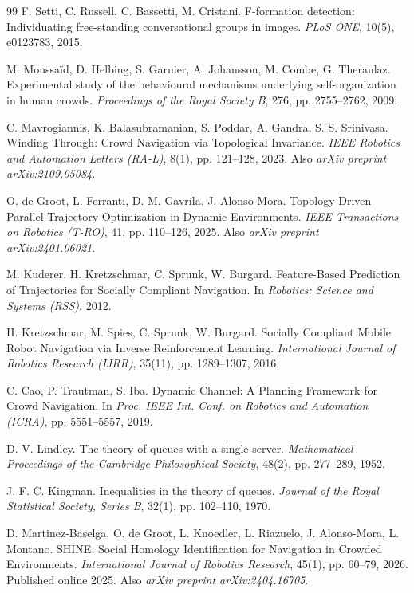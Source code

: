 \documentclass[11pt]{article}
\begin{document}
\begin{thebibliography}{99}
 F. Setti, C. Russell, C. Bassetti, M. Cristani. F-formation detection: Individuating free-standing conversational groups in images. \emph{PLoS ONE}, 10(5), e0123783, 2015.

 M. Moussa\"id, D. Helbing, S. Garnier, A. Johansson, M. Combe, G. Theraulaz. Experimental study of the behavioural mechanisms underlying self-organization in human crowds. \emph{Proceedings of the Royal Society B}, 276, pp. 2755--2762, 2009.

 C. Mavrogiannis, K. Balasubramanian, S. Poddar, A. Gandra, S. S. Srinivasa. Winding Through: Crowd Navigation via Topological Invariance. \emph{IEEE Robotics and Automation Letters (RA-L)}, 8(1), pp. 121--128, 2023. Also \emph{arXiv preprint arXiv:2109.05084}.

 O. de Groot, L. Ferranti, D. M. Gavrila, J. Alonso-Mora. Topology-Driven Parallel Trajectory Optimization in Dynamic Environments. \emph{IEEE Transactions on Robotics (T-RO)}, 41, pp. 110--126, 2025. Also \emph{arXiv preprint arXiv:2401.06021}.

 M. Kuderer, H. Kretzschmar, C. Sprunk, W. Burgard. Feature-Based Prediction of Trajectories for Socially Compliant Navigation. In \emph{Robotics: Science and Systems (RSS)}, 2012.

 H. Kretzschmar, M. Spies, C. Sprunk, W. Burgard. Socially Compliant Mobile Robot Navigation via Inverse Reinforcement Learning. \emph{International Journal of Robotics Research (IJRR)}, 35(11), pp. 1289--1307, 2016.

 C. Cao, P. Trautman, S. Iba. Dynamic Channel: A Planning Framework for Crowd Navigation. In \emph{Proc. IEEE Int. Conf. on Robotics and Automation (ICRA)}, pp. 5551--5557, 2019.

 D. V. Lindley. The theory of queues with a single server. \emph{Mathematical Proceedings of the Cambridge Philosophical Society}, 48(2), pp. 277--289, 1952.

 J. F. C. Kingman. Inequalities in the theory of queues. \emph{Journal of the Royal Statistical Society, Series B}, 32(1), pp. 102--110, 1970.

 D. Martinez-Baselga, O. de Groot, L. Knoedler, L. Riazuelo, J. Alonso-Mora, L. Montano. SHINE: Social Homology Identification for Navigation in Crowded Environments. \emph{International Journal of Robotics Research}, 45(1), pp. 60--79, 2026. Published online 2025. Also \emph{arXiv preprint arXiv:2404.16705}.


\end{thebibliography}
\end{document}
